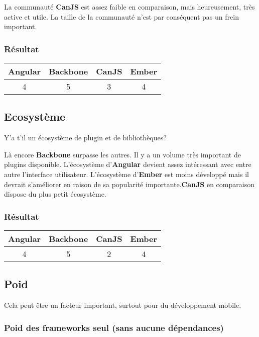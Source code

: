 La communauté \textbf{CanJS} est assez faible en comparaison, mais heureusement, très active et utile. La taille de la communauté n’est par conséquent pas un frein important.

\subsubsection{Résultat}
\begin{tabular}{|c|c|c|c|}
  \hline 
  Angular & Backbone & CanJS & Ember \\
  \hline 
  4 & 5 & 3 & 4 \\
  \hline
\end{tabular}

\subsection{Ecosystème}

Y’a t’il un écosystème de plugin et de bibliothèques?

Là encore \textbf{Backbone} surpasse les autres. Il y a un volume très important de plugins disponible. L’écosystème d’\textbf{Angular} devient assez intéressant avec entre autre l’interface utilisateur. L’écosystème d’\textbf{Ember} est moins développé mais il devrait s’améliorer en raison de sa popularité importante.\textbf{CanJS} en comparaison dispose du plus petit écosystème.



\subsubsection{Résultat}
\begin{tabular}{|c|c|c|c|}
  \hline 
  Angular & Backbone & CanJS & Ember \\
  \hline 
  4 & 5 & 2 & 4 \\
  \hline
\end{tabular}

\subsection{Poid}

Cela peut être un facteur important, surtout pour du développement mobile.

\subsubsection{Poid des frameworks seul (sans aucune dépendances)}


